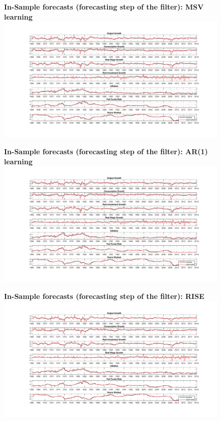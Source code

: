 \documentclass[12pt,reqno]{article}
\numberwithin{equation}{section}
\begin{document}
\begin{figure}[H]
\textbf{In-Sample forecasts (forecasting step of the filter): MSV learning}\\
\includegraphics[height=\textheight,width=\textwidth]{sw_msv_forecast_errors.pdf}
\end{figure}

\begin{figure}[H]
\textbf{In-Sample forecasts (forecasting step of the filter): AR(1) learning}\\
\includegraphics[height=\textheight,width=\textwidth]{sw_ar1_forecast_errors.pdf}
\end{figure}

\begin{figure}[H]
\textbf{In-Sample forecasts (forecasting step of the filter): RISE }\\
\includegraphics[height=\textheight,width=\textwidth]{rise_forecast_errors.pdf}
\end{figure}
\end{document}

